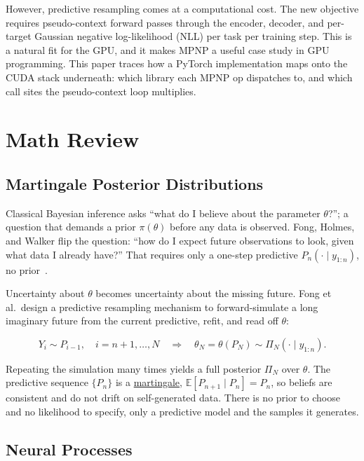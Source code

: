 \documentclass[11pt]{article}
\begin{document}
However, predictive resampling comes at a computational cost. The new
objective requires pseudo-context forward passes through the encoder,
decoder, and per-target Gaussian negative log-likelihood (NLL) per task
per training step. This is a natural fit for the GPU, and it makes MPNP
a useful case study in GPU programming. This paper traces how a PyTorch
implementation maps onto the CUDA stack underneath: which library each
MPNP op dispatches to, and which call sites the pseudo-context loop
multiplies.

\section{Math Review}

\subsection{Martingale Posterior Distributions}

Classical Bayesian inference asks ``what do I believe about the
parameter $\theta$?''; a question that demands a prior $\pi(\theta)$
before any data is observed. Fong, Holmes, and Walker flip the question:
``how do I expect future observations to look, given what data I already
have?'' That requires only a one-step predictive
$P_n(\cdot \mid y_{1:n})$, no prior~\cite{fong2023}.

Uncertainty about $\theta$ becomes uncertainty about the missing future.
Fong et al.~design a predictive resampling mechanism to forward-simulate
a long imaginary future from the current predictive, refit, and read off
$\theta$:

\begin{equation}
	Y_i \sim P_{i-1}, \quad i = n{+}1, \dots, N
	\quad\Longrightarrow\quad
	\theta_N = \theta(P_N) \sim \Pi_N(\cdot \mid y_{1:n}).
\end{equation}

Repeating the simulation many times yields a full posterior $\Pi_N$ over
$\theta$. The predictive sequence $\{P_n\}$ is a
\href{https://en.wikipedia.org/wiki/Martingale_(probability_theory)}{martingale},
$\mathbb{E}\!\left[P_{n+1} \mid P_n\right] = P_n$, so beliefs are
consistent and do not drift on self-generated data. There is no prior to
choose and no likelihood to specify, only a predictive model and the
samples it generates.

\subsection{Neural Processes}
\end{document}
